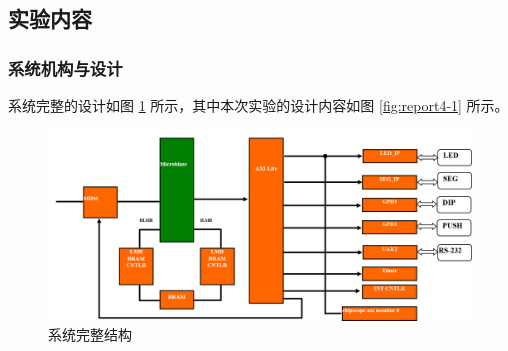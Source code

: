 \documentclass{ctexart}
\begin{document}
\subsection{实验内容}

\subsubsection{系统机构与设计}

系统完整的设计如图 \ref{fig:report3-1} 所示，其中本次实验的设计内容如图 \ref{fig:report4-1} 所示。
\begin{figure}[h!]
  \centering
  \includegraphics[width=1\linewidth]{report3-1}
  \caption{系统完整结构}
  \label{fig:report3-1}
\end{figure}
\end{document}
